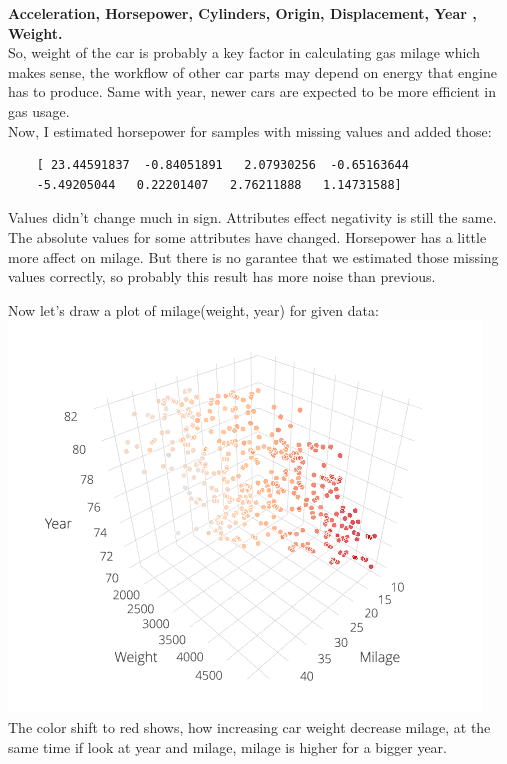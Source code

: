 \documentclass[12pt, letterpaper]{article}
\begin{document}
\begin{enumerate}[label=\Roman*.]
	{\bf Acceleration, Horsepower, Cylinders, Origin, Displacement, Year , Weight. }\\
	
	So, weight of the car is probably a key factor in calculating gas milage which makes sense, the workflow of other car parts may depend on energy that engine has to produce. Same with year, newer cars are expected to be more efficient in gas usage.\\
	
	Now, I estimated horsepower for samples with missing values and added those:
	\begin{verbatim}
	[ 23.44591837  -0.84051891   2.07930256  -0.65163644  
	-5.49205044   0.22201407   2.76211888   1.14731588]
	\end{verbatim}
	
	Values didn't change much in sign. Attributes effect negativity is still the same. The absolute values for some attributes have changed. Horsepower has a little more affect on milage. But there is no garantee
	that we estimated those missing values correctly, so probably this result has more noise than previous.
		
	Now let's draw a plot of milage(weight, year) for given data: \\
	\includegraphics[scale=0.8]{pics/4.png} \\
	
	The color shift to red shows, how increasing car weight decrease milage, at the same time if look at year and milage, milage is higher for a bigger year.
	
\end{enumerate}
	
\end{document}
